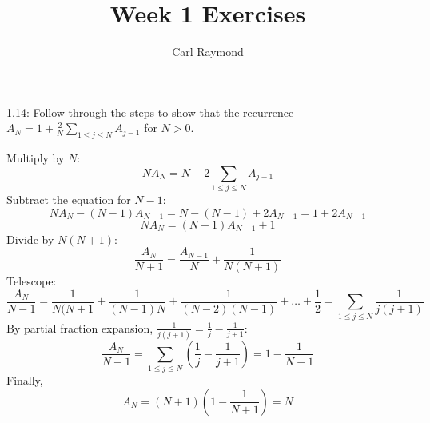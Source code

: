 \documentclass[11pt, oneside]{article}   	%
\title{Week 1 Exercises}
\author{Carl Raymond}
\begin{document}
\maketitle

1.14: Follow through the steps to show that the recurrence $A_N = 1 + \frac{2}{N}\sum_{1 \le j \le N} A_{j-1}$ for $N>0$.

Multiply by $N$:
\[
	N A_N = N + 2 \sum_{1 \le j \le N} A_{j-1}
\]
Subtract the equation for $N-1$:
\[
	NA_N - (N-1)A_{N-1} = N-(N-1) + 2A_{N-1} = 1 + 2 A_{N-1}
\]
\[
	NA_N = (N+1)A_{N-1} + 1
\]
Divide by $N(N+1)$:
\[
	\frac{A_N}{N+1} = \frac{A_{N-1}}{N} + \frac{1}{N(N+1)}
\]
Telescope:
\[
	\frac{A_N}{N-1} = \frac{1}{N(N+1} + \frac{1}{(N-1)N} + \frac{1}{(N-2)(N-1)} + \dots + \frac{1}{2} = \sum_{1 \le j \le N} \frac{1}{j(j+1)}
\]
By partial fraction expansion, $\frac{1}{j(j+1)} = \frac{1}{j}-\frac{1}{j+1}$:
\[
	\frac{A_N}{N-1} = \sum_{1 \le j \le N}(\frac{1}{j} - \frac{1}{j+1})  = 1-\frac{1}{N+1}
\]
Finally,
\[
	A_N = (N+1)(1-\frac{1}{N+1}) = N
\]
\end{document}
